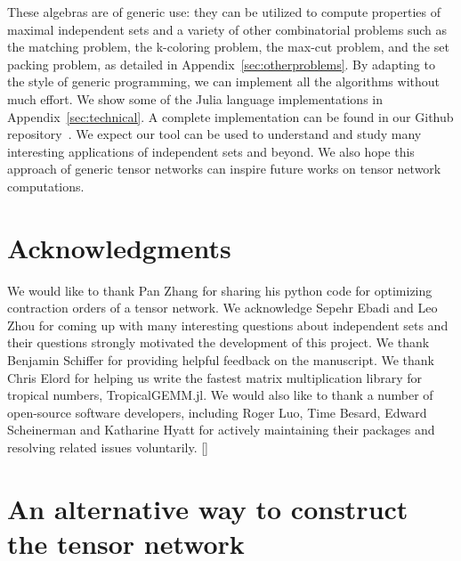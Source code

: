 \documentclass[onefignum, onetabnum]{siamart190516}
\newcommand{\<}{\langle}
\renewcommand{\>}{\rangle}
\newcommand{\App}[1]{Appendix~\ref{#1}}
\newcommand{\blue}[1]{[{\bf  \color{blue}{JG: #1}}]}
\begin{document}
These algebras are of generic use: they can be utilized to compute properties of maximal independent sets and a variety of other combinatorial problems such as the matching problem, the k-coloring problem, the max-cut problem, and the set packing problem, as detailed in \App{sec:otherproblems}. 
By adapting to the style of generic programming, we can implement all the algorithms without much effort.
We show some of the Julia language implementations in Appendix~\ref{sec:technical}.
A complete implementation can be found in our Github repository~\cite{GraphTensorNetworks}. 
We expect our tool can be used to understand and study many interesting applications of independent sets and beyond. We also hope this approach of generic tensor networks can inspire future works on tensor network computations.

\section*{Acknowledgments}
We would like to thank Pan Zhang for sharing his python code for optimizing contraction orders of a tensor network.
We acknowledge Sepehr Ebadi and Leo Zhou for coming up with many interesting questions about independent sets and their questions strongly motivated the development of this project.
We thank Benjamin Schiffer for providing helpful feedback on the manuscript.
We thank Chris Elord for helping us write the fastest matrix multiplication library for tropical numbers, TropicalGEMM.jl. %
We would also like to thank a number of open-source software developers, including Roger Luo, Time Besard, Edward Scheinerman and Katharine Hyatt
for actively maintaining their packages and resolving related issues voluntarily.
\blue{funding information}




\appendix

\section{An alternative way to construct the tensor network}\label{sec:energymodel}
\end{document}
